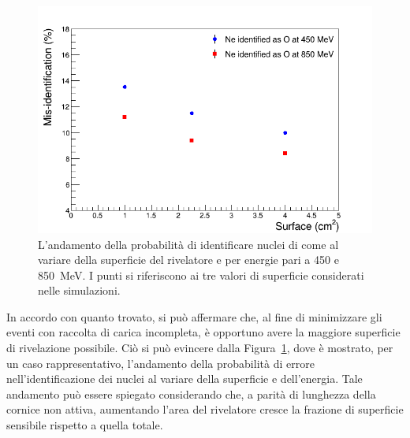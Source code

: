 \begin{figure} [!t]
	\centering
	\includegraphics[width=\textwidth, keepaspectratio]{Grafici_Tesi/Granularita/misident_surface3.png}
	\caption{L'andamento della probabilità di identificare nuclei di  come  al variare della superficie del rivelatore e per energie pari a 450 e 850~MeV. I punti si riferiscono ai tre valori di superficie considerati nelle simulazioni.} \label{fig:misident_vs_surface}
\end{figure}




In accordo con quanto trovato, si può affermare che, al fine di minimizzare gli eventi con raccolta di carica incompleta, è opportuno avere la maggiore superficie di rivelazione possibile.
Ciò si può evincere dalla Figura~\ref{fig:misident_vs_surface}, dove è mostrato, per un caso rappresentativo, l'andamento della probabilità di errore nell'identificazione dei nuclei al variare della superficie e dell'energia.
Tale andamento può essere spiegato considerando che, a parità di lunghezza della cornice non attiva, aumentando l'area del rivelatore cresce la frazione di superficie sensibile rispetto a quella totale.



